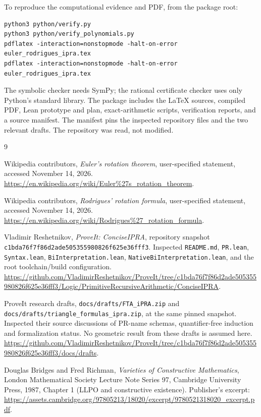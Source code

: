 To reproduce the computational evidence and PDF, from the package root:
\begin{lstlisting}
python3 python/verify.py
python3 python/verify_polynomials.py
pdflatex -interaction=nonstopmode -halt-on-error euler_rodrigues_ipra.tex
pdflatex -interaction=nonstopmode -halt-on-error euler_rodrigues_ipra.tex
\end{lstlisting}
The symbolic checker needs SymPy; the rational certificate checker uses
only Python's standard library. The package includes the LaTeX sources,
compiled PDF, Lean prototype and plan, exact-arithmetic scripts,
verification reports, and a source manifest. The manifest pins the
inspected repository files and the two relevant drafts. The repository
was read, not modified.

\begin{thebibliography}{9}
\raggedright
\small
{}
Wikipedia contributors, \emph{Euler's rotation theorem}, user-specified
statement, accessed November 14, 2026.
\url{https://en.wikipedia.org/wiki/Euler%27s_rotation_theorem}.

Wikipedia contributors, \emph{Rodrigues' rotation formula}, user-specified
statement, accessed November 14, 2026.
\url{https://en.wikipedia.org/wiki/Rodrigues%27_rotation_formula}.

Vladimir Reshetnikov, \emph{ProveIt: ConciseIPRA}, repository snapshot
\texttt{c1bda76f7f86d2ade505355980826f625e36fff3}.
Inspected \texttt{README.md}, \texttt{PR.lean}, \texttt{Syntax.lean},
\texttt{BiInterpretation.lean}, \texttt{NativeBiInterpretation.lean},
and the root toolchain/build configuration.
\url{https://github.com/VladimirReshetnikov/ProveIt/tree/c1bda76f7f86d2ade505355980826f625e36fff3/Logic/PrimitiveRecursiveArithmetic/ConciseIPRA}.

ProveIt research drafts, \texttt{docs/drafts/FTA\_iPRA.zip} and
\texttt{docs/drafts/triangle\_formulas\_ipra.zip}, at the same pinned
snapshot. Inspected their source discussions of PR-name schemas,
quantifier-free induction and formalization status. No geometric
result from these drafts is assumed here.
\url{https://github.com/VladimirReshetnikov/ProveIt/tree/c1bda76f7f86d2ade505355980826f625e36fff3/docs/drafts}.

Douglas Bridges and Fred Richman, \emph{Varieties of Constructive
Mathematics}, London Mathematical Society Lecture Note Series 97,
Cambridge University Press, 1987, Chapter 1 (LLPO and constructive
existence). Publisher's excerpt:
\url{https://assets.cambridge.org/97805213/18020/excerpt/9780521318020_excerpt.pdf}.


\end{thebibliography}
